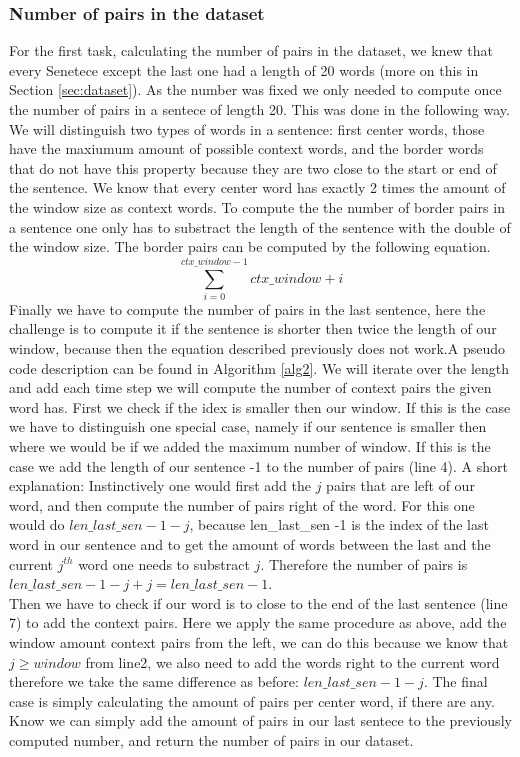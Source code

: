 \subsubsection{Number of pairs in the dataset}
For the first task, calculating the number of pairs in the dataset, we knew that every Senetece except the last one had a length of 20 words (more on this in Section \ref{sec:dataset}). As the number was fixed we only needed to compute once the number of pairs in a sentece of length 20. This was done in the following way. We will distinguish two types of words in a sentence: first center words, those have the maxiumum amount of possible context words, and the border words that do not have this property because they are two close to the start or end of the sentence.
We know that every center word has exactly 2 times the amount of the window size as context words. To compute the the number of border pairs in a sentence one only has to substract the length of the sentence with the double of the window size. The border pairs can be computed by the following equation. 
\begin{equation}
\sum_{i=0}^{ctx\_window -1} ctx\_window + i
\end{equation}
Finally we have to compute the number of pairs in the last sentence, here the challenge is to compute it if the sentence is shorter then twice the length of our window, because then the equation described previously does not work.A pseudo code description can be found in Algorithm \ref{alg2}. We will iterate over the length and add each time step we will compute the number of context pairs the given word has. First we check if the idex is smaller then our window. If this is the case we have to distinguish one special case, namely if our sentence is smaller then where we would be if we added the maximum number of window. If this is the case we add the length of our sentence -1 to the number of pairs (line 4). A short explanation: Instinctively one would first add the $j$ pairs that are left of our word, and then compute the number of pairs right of the word. For this one would do $len\_last\_sen -1 -j$, because len\_last\_sen -1  is the index of the last word in our sentence and to get the amount of words between the  last and the current $j^{th}$ word one needs to substract $j$. Therefore the number of pairs is $len\_last\_sen -1 -j + j = len\_last\_sen -1$.\\ Then we have to check if our word is to close to the end of the last sentence (line 7) to add the context pairs. Here we apply the same procedure as above, add the window amount context pairs from the left, we can do this because we know that $j \geq window$ from line2, we also need to add the words right to the current word therefore we take the same difference as before: $len\_last\_sen -1 -j$.
The final case is simply calculating the amount of pairs per center word, if there are any. \\
Know we can simply add the amount of pairs in our last sentece to the previously computed number, and return the number of pairs in our dataset.

